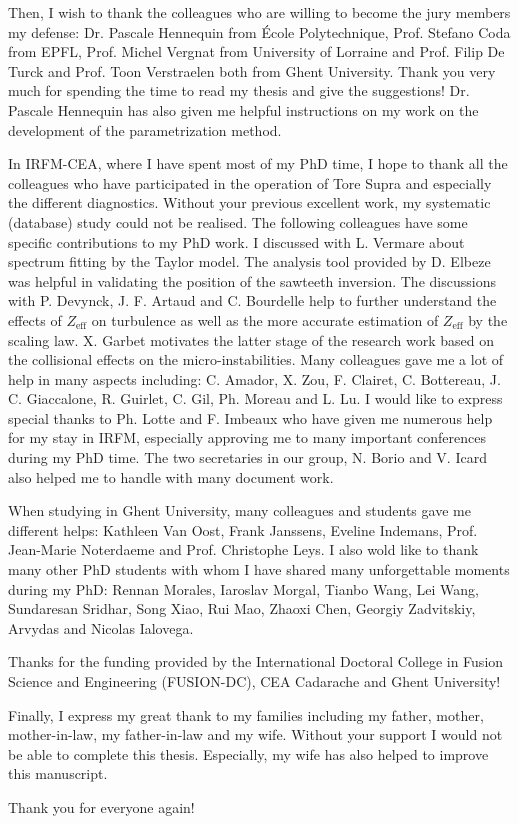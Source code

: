 Then, I wish to thank the colleagues who are willing to become the jury members my defense: Dr. Pascale Hennequin from \'{E}cole Polytechnique, Prof. Stefano Coda from EPFL, Prof. Michel Vergnat from University of Lorraine and Prof. Filip De Turck and Prof. Toon Verstraelen both from Ghent University. Thank you very much for spending the time to read my thesis and give the suggestions! Dr. Pascale Hennequin has also given me helpful instructions on my work on the development of the parametrization method.


In IRFM-CEA, where I have spent most of my PhD time, I hope to thank all the colleagues who have participated in the operation of Tore Supra and especially the different diagnostics. Without your previous excellent work, my systematic (database) study could not be realised. The following colleagues have some specific contributions to my PhD work. I discussed with L. Vermare about spectrum fitting by the Taylor model. The analysis tool provided by D. Elbeze was helpful in validating the position of the sawteeth inversion. The discussions with P. Devynck, J. F. Artaud and C. Bourdelle help to further understand the effects of $Z_\mathrm{eff}$ on turbulence as well as the more accurate estimation of $Z_\mathrm{eff}$ by the scaling law. X. Garbet motivates the latter stage of the research work based on the collisional effects on the micro-instabilities. Many colleagues gave me a lot of help in many aspects including: C. Amador, X. Zou, F. Clairet, C. Bottereau, J. C. Giaccalone, R. Guirlet, C. Gil, Ph. Moreau and L. Lu. I would like to express special thanks to Ph. Lotte and F. Imbeaux who have given me numerous help for my stay in IRFM, especially approving me to many important conferences during my PhD time. The two secretaries in our group, N. Borio and V. Icard also helped me to handle with many document work.


When studying in Ghent University, many colleagues and students gave me different helps: Kathleen Van Oost, Frank Janssens, Eveline Indemans, Prof. Jean-Marie Noterdaeme and Prof. Christophe Leys. I also wold like to thank many other PhD students with whom I have shared many unforgettable moments during my PhD: Rennan Morales, Iaroslav Morgal, Tianbo Wang, Lei Wang, Sundaresan Sridhar, Song Xiao, Rui Mao, Zhaoxi Chen, Georgiy Zadvitskiy, Arvydas and Nicolas Ialovega.


Thanks for the funding provided by the International Doctoral College in Fusion Science and Engineering (FUSION-DC), CEA Cadarache and Ghent University!


Finally, I express my great thank to my families including my father, mother, mother-in-law, my father-in-law and my wife. Without your support I would not be able to complete this thesis. Especially, my wife has also helped to improve this manuscript.


Thank you for everyone again!
















